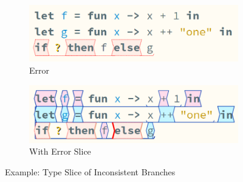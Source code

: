\begin{figure}[h]
\centering
\begin{subfigure}{0.49\textwidth}
\centering
\includegraphics[width=1\textwidth]{Media/Figures/inconsistent_branches_example}
\caption{Error}
\end{subfigure}
\begin{subfigure}{0.49\textwidth}
\centering
\includegraphics[width=1\textwidth]{Media/Figures/inconsistent_branches_example_sliced}
\caption{With Error Slice}
\end{subfigure}
\caption{Example: Type Slice of Inconsistent Branches}
\label{fig:InconsistentBranchesExample}
\end{figure}

